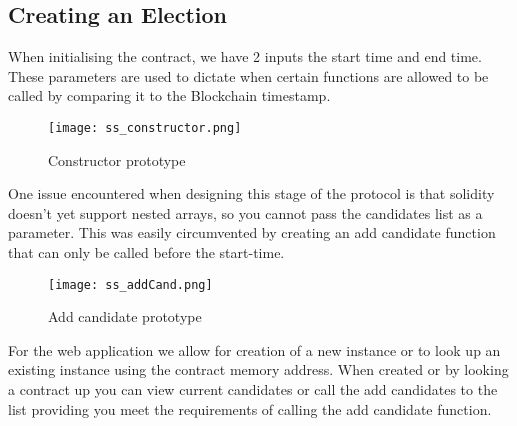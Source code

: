 \documentclass{entcs}
\begin{document}
\subsection{Creating an Election}

When initialising the contract, we have 2 inputs the start time and end time. These parameters are used to dictate when certain functions are allowed to be called by comparing it to the Blockchain timestamp.

\begin{figure}[h!]
    \centering
    \texttt{[image: ss\_constructor.png]}
    \caption{Constructor prototype}
    \label{fig:constructor}
\end{figure}


One issue encountered when designing this stage of the protocol is that solidity doesn't yet support nested arrays, so you cannot pass the candidates list as a parameter. This was easily circumvented by creating an add candidate function that can only be called before the start-time. 

\begin{figure}[h!]
    \centering
    \texttt{[image: ss\_addCand.png]}
    \caption{Add candidate prototype}
    \label{fig:addCand}
\end{figure}

For the web application we allow for creation of a new instance or to look up an existing instance using the contract memory address. When created or by looking a contract up you can view current candidates or call the add candidates to the list providing you meet the requirements of calling the add candidate function.

\end{document}
